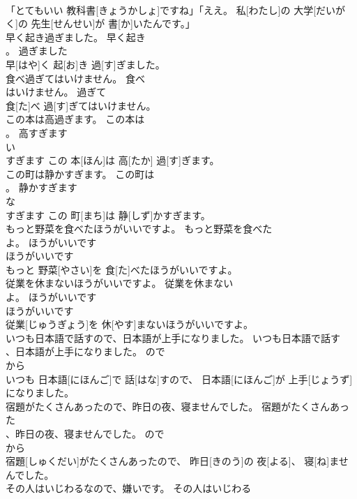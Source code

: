 \documentclass[8pt]{extreport}
\begin{document}
\begin{CJK}{UTF8}{min}
\\	「とてもいい 教科書[きょうかしょ]ですね」「ええ。 私[わたし]の 大学[だいがく]の 先生[せんせい]が 書[か]いたんです。」	
\\	早く起き過ぎました。	早く起き
\\	。	過ぎました	
\\	早[はや]く 起[お]き 過[す]ぎました。	
\\	食べ過ぎてはいけません。	食べ
\\	はいけません。	過ぎて	
\\	食[た]べ 過[す]ぎてはいけません。	
\\	この本は高過ぎます。	この本は
\\	。	高すぎます	
\\	い 
\\	すぎます	この 本[ほん]は 高[たか] 過[す]ぎます。	
\\	この町は静かすぎます。	この町は
\\	。	静かすぎます	
\\	な 
\\	すぎます	この 町[まち]は 静[しず]かすぎます。	
\\	もっと野菜を食べたほうがいいですよ。	もっと野菜を食べた
\\	よ。	ほうがいいです	
\\	ほうがいいです 
\\	もっと 野菜[やさい]を 食[た]べたほうがいいですよ。	
\\	従業を休まないほうがいいですよ。	従業を休まない
\\	よ。	ほうがいいです	
\\	ほうがいいです 
\\	従業[じゅうぎょう]を 休[やす]まないほうがいいですよ。	
\\	いつも日本語で話すので、日本語が上手になりました。	いつも日本語で話す
\\	、日本語が上手になりました。	ので	
\\	から	
\\	いつも 日本語[にほんご]で 話[はな]すので、 日本語[にほんご]が 上手[じょうず]になりました。	
\\	宿題がたくさんあったので、昨日の夜、寝ませんでした。	宿題がたくさんあった
\\	、昨日の夜、寝ませんでした。	ので	
\\	から	
\\	宿題[しゅくだい]がたくさんあったので、 昨日[きのう]の 夜[よる]、 寝[ね]ませんでした。	
\\	その人はいじわるなので、嫌いです。	その人はいじわる

\end{CJK}
\end{document}
